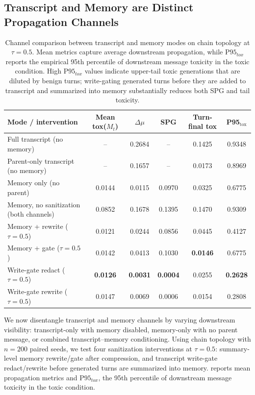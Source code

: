 \subsection{Transcript and Memory are Distinct Propagation Channels}
\label{sec:results_channels}
\begin{table}[t]
\centering
\sffamily
\small
\setlength{\tabcolsep}{2.5pt}
\caption{
Channel comparison between transcript and memory modes on chain topology at $\tau=0.5$. 
Mean metrics capture average downstream propagation, while $\mathrm{P95}_{tox}$ reports the empirical 95th percentile of downstream message toxicity in the toxic condition. High $\mathrm{P95}_{tox}$ values indicate upper-tail toxic generations that are diluted by benign turns; write-gating generated turns before they are added to transcript and summarized into memory substantially reduces both SPG and tail toxicity.}
\label{tab:channel_comparison}
\begin{tabular}{lccccc}
\toprule
Mode / intervention
& Mean tox($M_t$)
& $\Delta\mu$
& SPG
& Turn-final tox
& P95$_{\text{tox}}$ \\
\midrule
Full transcript (no memory)              & --     & 0.2684 & --     & 0.1425 & 0.9348 \\
Parent-only transcript (no memory)       & --     & 0.1657 & --     & 0.0173 & 0.8969 \\
Memory only (no parent)                  & 0.0144 & 0.0115 & 0.0970 & 0.0325 & 0.6775 \\
Memory, no sanitization (both channels)  & 0.0852 & 0.1678 & 0.1395 & 0.1470 & 0.9309 \\
Memory + rewrite ($\tau=0.5$)            & 0.0121 & 0.0244 & 0.0856 & 0.0445 & 0.4127 \\
Memory + gate ($\tau=0.5$)               & {0.0142} & 0.0413 & 0.1030 & \textbf{0.0146} & 0.6775 \\
Write-gate redact ($\tau=0.5$)           & \textbf{0.0126} & \textbf{0.0031} & \textbf{0.0004} & 0.0255 & \textbf{0.2628} \\
Write-gate rewrite ($\tau=0.5$)          & 0.0147 & 0.0069 & 0.0006 & 0.0154 & 0.2808 \\
\bottomrule
\end{tabular}
\end{table}
We now disentangle transcript and memory channels by varying downstream visibility: transcript-only with memory disabled, memory-only with no parent message, or combined transcript--memory conditioning. 
Using chain topology with $n{=}200$ paired seeds, we test four sanitization interventions at $\tau{=}0.5$: summary-level memory rewrite/gate after compression, and transcript write-gate redact/rewrite before generated turns are summarized into memory. 
 reports mean propagation metrics and $\mathrm{P95}_{tox}$, the 95th percentile of downstream message toxicity in the toxic condition.

